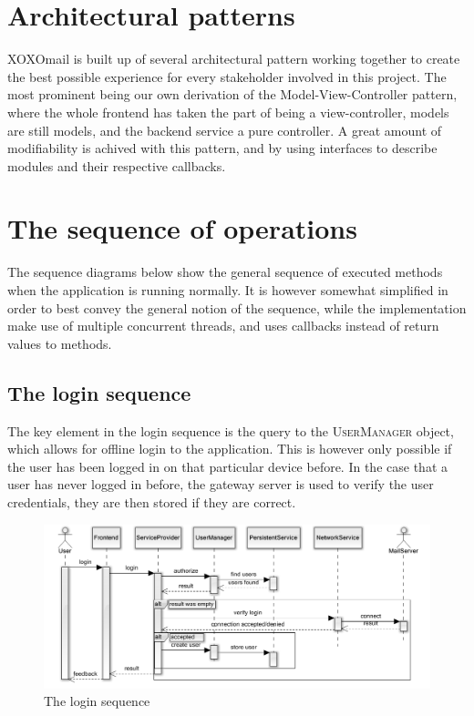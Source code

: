 \section{Architectural patterns}
	XOXOmail is built up of several architectural pattern working together to create the best possible experience for every stakeholder involved in this project. The most prominent being our own derivation of the Model-View-Controller pattern, where the whole frontend has taken the part of being a view-controller, models are still models, and the backend service a pure controller. A great amount of modifiability is achived with this pattern, and by using interfaces to describe modules and their respective callbacks. 
	
\section{The sequence of operations}
	The sequence diagrams below show the general sequence of executed methods when the application is running normally. It is however somewhat simplified in order to best convey the general notion of the sequence, while the implementation make use of multiple concurrent threads, and uses callbacks instead of return values to methods. 
	\subsection{The login sequence}
	The key element in the login sequence is the query to the \textsc{UserManager} object, which allows for offline login to the application. This is however only possible if the user has been logged in on that particular device before. In the case that a user has never logged in before, the gateway server is used to verify the user credentials, they are then stored if they are correct. 
	\begin{figure}[H]
		\includegraphics[width=\textwidth]{LoginSequence}
		\caption{The login sequence}
		\label{fig:lifecycle}
	\end{figure}
	
